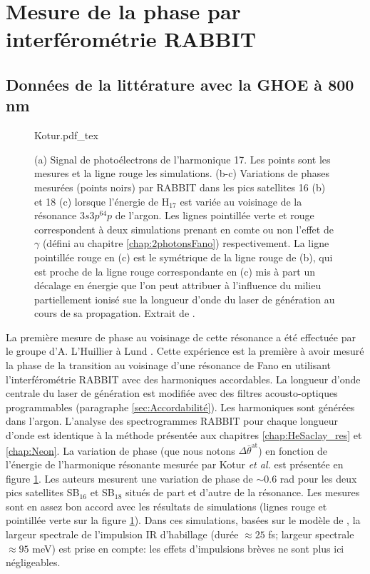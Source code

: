 \section{Mesure de la phase par interférométrie RABBIT}
\label{sec:ArRABBIT}
\subsection{Données de la littérature avec la GHOE à 800 nm}
\begin{figure}[ht]
\centering
\def\svgwidth{0.5\textwidth}
{Kotur.pdf_tex}
\caption{(a) Signal de photoélectrons de l'harmonique 17. Les points sont les mesures et la ligne rouge les simulations. (b-c) Variations de phases mesurées (points noirs) par RABBIT dans les pics satellites 16 (b) et 18 (c) lorsque l'énergie de H$_{17}$ est variée au voisinage de la résonance $3s3p^64p$ de l'argon. Les lignes pointillée verte et rouge correspondent à deux simulations prenant en comte ou non l'effet de $\gamma$ (défini au chapitre \ref{chap:2photonsFano}) respectivement. La ligne pointillée rouge en (c) est le symétrique de la ligne rouge de (b), qui est proche de la ligne rouge correspondante en (c) mis à part un décalage en énergie que l'on peut attribuer à l'influence du milieu partiellement ionisé sue la longueur d'onde du laser de génération au cours de sa propagation. Extrait de .}
\label{fig:Kotur}
\end{figure}

La première mesure de phase au voisinage de cette résonance a été effectuée par le groupe d'A. L'Huillier à Lund . Cette expérience est la première à avoir mesuré la phase de la transition au voisinage d'une résonance de Fano en utilisant l'interférométrie RABBIT avec des harmoniques accordables. La longueur d'onde centrale du laser de génération est modifiée avec des filtres acousto-optiques programmables (paragraphe \ref{sec:Accordabilité}). Les harmoniques sont générées dans l'argon. L'analyse des spectrogrammes RABBIT pour chaque longueur d'onde est identique à la méthode présentée aux chapitres \ref{chap:HeSaclay_res} et \ref{chap:Neon}. La variation de phase (que nous notons $\Delta \bar{\theta}^{\text{at}}$) en fonction de l'énergie de l'harmonique résonante mesurée par Kotur \textit{et al.} est présentée en figure \ref{fig:Kotur}. Les auteurs mesurent une variation de phase de $\sim 0.6$ rad pour les deux pics satellites SB$_{16}$ et SB$_{18}$ situés de part et d'autre de la résonance. Les mesures sont en assez bon accord avec les résultats de simulations (lignes rouge et pointillée verte sur la figure \ref{fig:Kotur}). Dans ces simulations, basées sur le modèle de , la largeur spectrale de l'impulsion IR d'habillage (durée $\approx 25$ fs; largeur spectrale $\approx 95$ meV) est prise en compte: les effets d'impulsions brèves ne sont plus ici négligeables.

